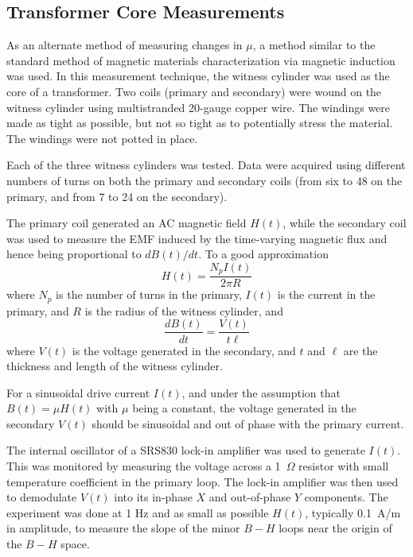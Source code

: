 
\subsection{Transformer Core Measurements}

As an alternate method of measuring changes in $\mu$, a method similar
to the standard method of magnetic materials characterization via
magnetic induction was used.  In this measurement technique, the
witness cylinder was used as the core of a transformer.  Two coils
(primary and secondary) were wound on the witness cylinder using
multistranded 20-gauge copper wire.  The windings were made as tight
as possible, but not so tight as to potentially stress the material.
The windings were not potted in place.

Each of the three witness cylinders was tested.  Data were acquired
using different numbers of turns on both the primary and secondary
coils (from six to 48 on the primary, and from 7 to 24 on the
secondary).



The primary coil generated an AC magnetic field $H(t)$, while the
secondary coil was used to measure the EMF induced by the time-varying
magnetic flux and hence being proportional to $dB(t)/dt$.  To a good
approximation
\begin{equation}
H(t)=\frac{N_pI(t)}{2\pi R}
\end{equation}
where $N_p$ is the number of turns in the primary, $I(t)$ is the
current in the primary, and $R$ is the radius of the witness cylinder,
and
\begin{equation}
\frac{dB(t)}{dt}=\frac{V(t)}{t\ell}
\end{equation}
where $V(t)$ is the voltage generated in the secondary, and $t$ and
$\ell$ are the thickness and length of the witness cylinder.

For a sinusoidal drive current $I(t)$, and under the assumption that
$B(t)=\mu H(t)$ with $\mu$ being a constant, the voltage generated in
the secondary $V(t)$ should be sinusoidal and out of phase with the
primary current.

The internal oscillator of a SRS830 lock-in amplifier was used to
generate $I(t)$.  This was monitored by measuring the voltage across a
1~$\Omega$ resistor with small temperature coefficient in the primary
loop.  The lock-in amplifier was then used to demodulate $V(t)$ into
its in-phase $X$ and out-of-phase $Y$ components.  The experiment was
done at 1 Hz and as small as possible $H(t)$, typically 0.1~A/m in
amplitude, to measure the slope of the minor $B-H$ loops near the
origin of the $B-H$ space.

